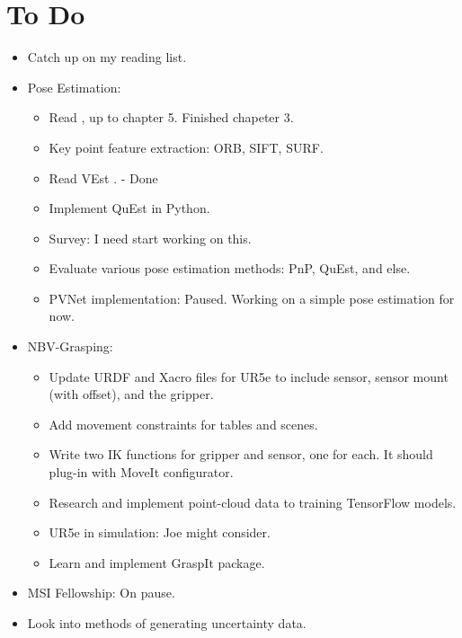\documentclass[11pt]{article}
\begin{document}
\section{To Do}
\begin{itemize}
  \item Catch up on my reading list.
  \item Pose Estimation:
  \begin{itemize}
      \item Read \cite{ma2012invitation}, up to chapter 5. Finished chapeter 3.
      \item Key point feature extraction: ORB, SIFT, SURF.
      \item Read VEst \cite{dani2009position}. - Done
      \item Implement QuEst in Python.
      \item Survey: I need start working on this.
      \item Evaluate various pose estimation methods: PnP, QuEst, and else.
      \item PVNet implementation: Paused. Working on a simple pose estimation for now.
  \end{itemize}
  \item NBV-Grasping:
      \begin{itemize}
      \item Update URDF and Xacro files for UR5e to include sensor,
sensor mount (with offset), and the gripper.
      \item Add movement constraints for tables and scenes.
      \item Write two IK functions for gripper and sensor, one for each. It should plug-in with MoveIt configurator.
      \item Research and implement point-cloud data to training TensorFlow models.
      \item UR5e in simulation: Joe might consider.
      \item Learn and implement GraspIt package.
      \end{itemize}

  \item MSI Fellowship: On pause.
  \item Look into methods of generating uncertainty data.
\end{itemize}
\end{document}
